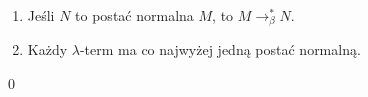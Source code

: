 \begin{wniosek}\label{thm:ch_wniosek2_untyped}
    \begin{enumerate}[label={(\arabic*)}, ref={(\arabic*)}]
  \setlength\itemsep{0em}
  \item Jeśli \(N\) to postać normalna \(M\), to \(M\to^{*}_\beta N\).
  \item Każdy \(\lambda\)-term ma co najwyżej jedną postać normalną.
  \end{enumerate}
\end{wniosek}
\begin{dowod}
  \qed
\end{dowod}

